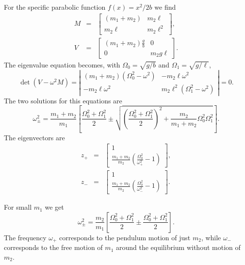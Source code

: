 \documentclass[letterpaper,11pt]{article}
\begin{document}
For the specific parabolic function $f(x) = x^2/2b$ we find
\begin{eqnarray*}
  M & = & \left[ \begin{array}{cc}
          (m_1 + m_2) & m_2 \ell \\
           m_2 \ell & m_2 \ell^2
         \end{array} \right], \\
  V & = & \left[ \begin{array}{cc}
          (m_1 + m_2) \frac{g}{b} & 0 \\
          0 & m_2 g \ell
         \end{array} \right].
\end{eqnarray*}
The eigenvalue equation becomes, with $\Omega_0 = \sqrt{g/b}$ and $\Omega_1 = \sqrt{g/\ell}$,
\begin{equation*}
 \det (V - \omega^2 M) = \left| \begin{array}{cc}
          (m_1 + m_2) (\Omega_0^2 - \omega^2) & - m_2 \ell \omega^2 \\
           - m_2 \ell \omega^2 & m_2 \ell^2 (\Omega_1^2 - \omega^2)
         \end{array} \right| = 0.
\end{equation*}
The two solutions for this equations are
\begin{equation*}
 \omega_\pm^2 = \frac{m_1 + m_2}{m_1} \left[ \frac{\Omega_0^2 + \Omega_1^2}{2} \pm \sqrt{\left(\frac{\Omega_0^2 + \Omega_1^2}{2}\right)^2 + \frac{m_2}{m_1 + m_2} \Omega_0^2 \Omega_1^2} \right].
\end{equation*}
The eigenvectors are
\begin{eqnarray*}
 z_+ & = & \left[ \begin{array}{c}
                   1 \\
                   \frac{m_1 + m_2}{m_2} \left(\frac{\Omega_0^2}{\omega_+^2} - 1\right)
                  \end{array} \right], \\
 z_- & = & \left[ \begin{array}{c}
                   1 \\
                   \frac{m_1 + m_2}{m_2} \left(\frac{\Omega_0^2}{\omega_-^2} - 1\right)
                  \end{array} \right].
\end{eqnarray*}

For small $m_1$ we get
\begin{equation*}
 \omega_\pm^2 = \frac{m_2}{m_1} \left[ \frac{\Omega_0^2 + \Omega_1^2}{2} \pm \frac{\Omega_0^2 + \Omega_1^2}{2} \right].
\end{equation*}
The frequency $\omega_+$ corresponds to the pendulum motion of just $m_2$, while $\omega_-$ corresponds to the free motion of $m_1$ around the equilibrium without motion of $m_2$.
\end{document}
